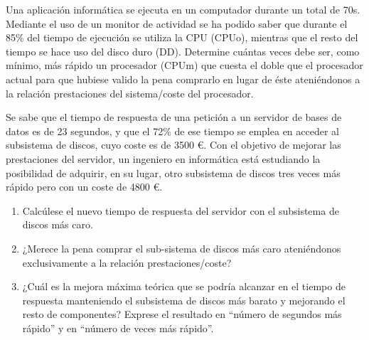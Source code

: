 \begin{ejercicio}
Una aplicación informática se ejecuta en un computador durante un total de 70s. Mediante el uso de un monitor de actividad se ha podido saber que durante el 85\% del tiempo de ejecución se utiliza la CPU (CPUo), mientras que el resto del tiempo se hace uso del disco duro (DD). Determine cuántas veces debe ser, como mínimo, más rápido un procesador (CPUm) que cuesta el doble que el procesador actual para que hubiese valido la pena comprarlo en lugar de éste ateniéndonos a la relación prestaciones del sistema/coste del procesador.
\end{ejercicio}

\begin{ejercicio}
Se sabe que el tiempo de respuesta de una petición a un servidor de bases de datos es de 23 segundos, y que el 72\% de ese tiempo se emplea en acceder al subsistema de discos, cuyo coste es de 3500 \euro. Con el objetivo de mejorar las prestaciones del servidor, un ingeniero en informática está estudiando la posibilidad de adquirir, en su lugar, otro subsistema de discos tres veces más rápido pero con un coste de 4800 \euro.
\begin{enumerate}
    \item Calcúlese el nuevo tiempo de respuesta del servidor con el subsistema de discos más caro.
    \item ¿Merece la pena comprar el sub-sistema de discos más caro ateniéndonos exclusivamente a la relación prestaciones/coste?
    \item ¿Cuál es la mejora máxima teórica que se podría alcanzar en el tiempo de respuesta manteniendo el subsistema de discos más barato y mejorando el resto de componentes? Exprese el resultado en “número de segundos más rápido” y en “número de veces más rápido”.
\end{enumerate}

\end{ejercicio}

